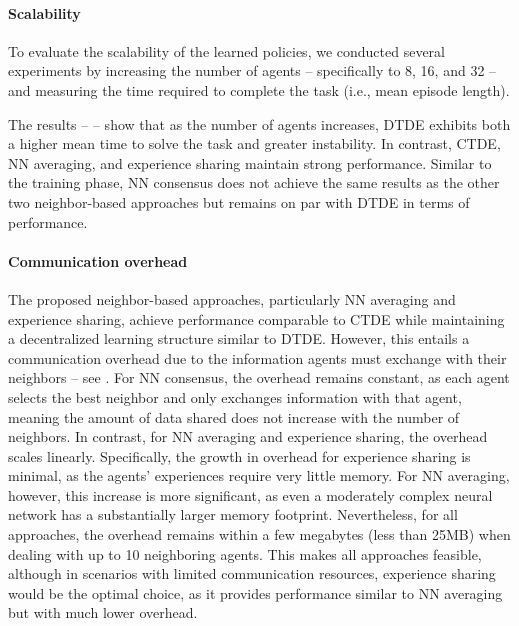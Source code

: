 \documentclass[sigconf]{acmart}
\begin{document}
\paragraph{Scalability}
To evaluate the scalability of the learned policies, we conducted several experiments by increasing the number 
 of agents -- specifically to 8, 16, and 32 -- and measuring the time required to complete the task 
 (i.e., mean episode length). 

The results --  -- show that as the number of agents increases, DTDE exhibits both a higher mean time 
 to solve the task and greater instability. 
%
In contrast, CTDE, NN averaging, and experience sharing maintain strong performance. 
%
Similar to the training phase, NN consensus does not achieve the same results as the other two neighbor-based 
 approaches but remains on par with DTDE in terms of performance.


\paragraph{Communication overhead}

The proposed neighbor-based approaches, particularly NN averaging and experience sharing, achieve performance
 comparable to CTDE while maintaining a decentralized learning structure similar to DTDE. 
% 
However, this entails a communication overhead due to the information agents must exchange with their neighbors
 -- see . 
%
For NN consensus, the overhead remains constant, as each agent selects the best neighbor and only exchanges 
 information with that agent, meaning the amount of data shared does not increase with the number of neighbors. 
% 
In contrast, for NN averaging and experience sharing, the overhead scales linearly. 
%
Specifically, the growth in overhead for experience sharing is minimal, as the agents' experiences require very 
 little memory. 
%
For NN averaging, however, this increase is more significant, as even a moderately complex neural network 
 has a substantially larger memory footprint.
% 
Nevertheless, for all approaches, the overhead remains within a few megabytes (less than 25MB) when dealing with 
 up to 10 neighboring agents.
%
This makes all approaches feasible, although in scenarios with limited communication resources, experience 
 sharing would be the optimal choice, as it provides performance similar to NN averaging but with 
 much lower overhead.
\end{document}
